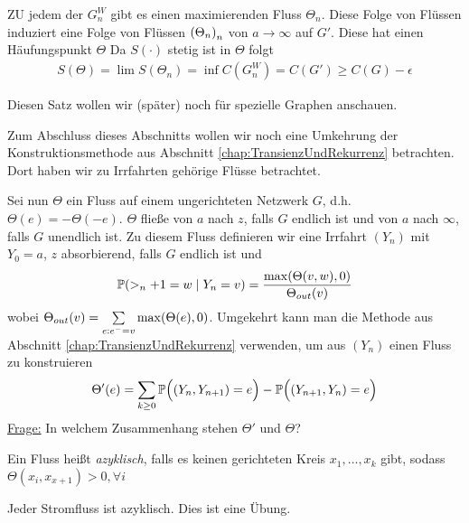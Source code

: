 \begin{beweis}
	ZU jedem der $G_n^W$ gibt es einen maximierenden Fluss $\Theta_n$. Diese Folge von Flüssen induziert eine Folge von Flüssen $\left(\Theta_n\right)_n$ von $a \to \infty$ auf $G'$. Diese hat einen Häufungspunkt $\Theta$ Da $S(\cdot)$ stetig ist in $\Theta$ folgt
	\begin{align}
		S(\Theta) = \lim S(\Theta_n) = \inf C(G^W_n) = C(G') \geq C(G) - \epsilon
	\end{align}

	\end{beweis}
	Diesen Satz wollen wir (später) noch für spezielle Graphen anschauen. 

Zum Abschluss dieses Abschnitts wollen wir noch eine Umkehrung der Konstruktionsmethode aus Abschnitt \ref{chap:TransienzUndRekurrenz} betrachten. Dort haben wir zu Irrfahrten gehörige Flüsse betrachtet. 

Sei nun $\Theta$ ein Fluss auf einem ungerichteten Netzwerk $G$, d.h. $\Theta(e) = - \Theta(-e)$. $\Theta$ fließe von $a$ nach $z$, falls $G$ endlich ist und von $a$ nach $\infty$, falls $G$ unendlich ist. Zu diesem Fluss definieren wir eine Irrfahrt $(Y_n)$ mit $Y_0 = a$, $z$ absorbierend, falls $G$ endlich ist und 
\begin{align}
	\propE{>_n+1 = w \given Y_n = v} = \frac{\max\enb{\Theta(v,w),0}}{\Theta_{out}(v)}
\end{align}
wobei $\Theta_{out}(v) = \sum\limits_{e: e^-=v} \max\enb{\Theta(e),0}$.
Umgekehrt kann man die Methode aus Abschnitt \ref{chap:TransienzUndRekurrenz} verwenden, um aus $(Y_n)$ einen Fluss zu konstruieren
\begin{align}
	\Theta'(e) = \sum\limits_{k \geq 0}\mathbb{P} \Big( (Y_n,Y_{n+1}) = e\Big) - \mathbb{P}\Big((Y_{n+1},Y_n) = e\Big)
\end{align} 
\underline{Frage:} In welchem Zusammenhang stehen $\Theta'$ und $\Theta$?
\begin{definition}
	Ein Fluss heißt \emph{azyklisch}, falls es keinen gerichteten Kreis $x_1, \dots, x_k$ gibt, sodass $\Theta(x_i,x_{x+1}) > 0, \forall i$  
\end{definition}

\begin{beispiel}
	Jeder Stromfluss ist azyklisch. Dies ist eine Übung.
\end{beispiel}

